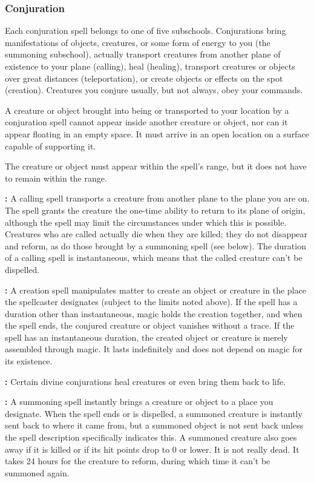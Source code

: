 \subsubsection{Conjuration}

Each conjuration spell belongs to one of five subschools. Conjurations bring manifestations 
of objects, creatures, or some form of energy to you (the summoning subschool), 
actually transport creatures from another plane of existence to your plane (calling), 
heal (healing), transport creatures or objects over great distances (teleportation), 
or create objects or effects on the spot (creation). Creatures you conjure usually, 
but not always, obey your commands.

A creature or object brought into being or transported to your location by a conjuration 
spell cannot appear inside another creature or object, nor can it appear floating 
in an empty space. It must arrive in an open location on a surface capable of supporting 
it.

The creature or object must appear within the spell's range, but it does not have 
to remain within the range.

\textbf{:} A calling spell transports a creature from another plane to the 
plane you are on. The spell grants the creature the one-time ability to return 
to its plane of origin, although the spell may limit the circumstances under which 
this is possible. Creatures who are called actually die when they are killed; they 
do not disappear and reform, as do those brought by a summoning spell (see below). 
The duration of a calling spell is instantaneous, which means that the called creature 
can't be dispelled.

\textbf{:} A creation spell manipulates matter to create an object or creature 
in the place the spellcaster designates (subject to the limits noted above). If 
the spell has a duration other than instantaneous, magic holds the creation together, 
and when the spell ends, the conjured creature or object vanishes without a trace. 
If the spell has an instantaneous duration, the created object or creature is merely 
assembled through magic. It lasts indefinitely and does not depend on magic for 
its existence.

\textbf{:} Certain divine conjurations heal creatures or even bring them 
back to life.

\textbf{:} A summoning spell instantly brings a creature or object to 
a place you designate. When the spell ends or is dispelled, a summoned creature 
is instantly sent back to where it came from, but a summoned object is not sent 
back unless the spell description specifically indicates this. A summoned creature 
also goes away if it is killed or if its hit points drop to 0 or lower. It is not 
really dead. It takes 24 hours for the creature to reform, during which time it 
can't be summoned again.

